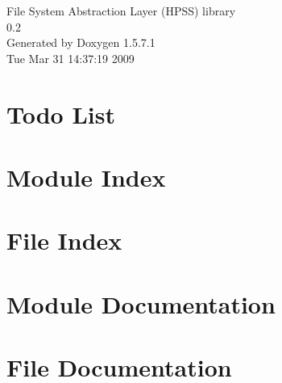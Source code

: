 \documentclass[a4paper]{book}
\begin{document}
\begin{titlepage}
\vspace*{7cm}
\begin{center}
{\Large File System Abstraction Layer (HPSS) library \\[1ex]\large 0.2 }\\
\vspace*{1cm}
{\large Generated by Doxygen 1.5.7.1}\\
\vspace*{0.5cm}
{\small Tue Mar 31 14:37:19 2009}\\
\end{center}
\end{titlepage}
\clearemptydoublepage
{}
\tableofcontents
\clearemptydoublepage
{}
\chapter{Todo List}
\label{todo}

\chapter{Module Index}

\chapter{File Index}

\chapter{Module Documentation}


\chapter{File Documentation}
























\printindex
\end{document}
